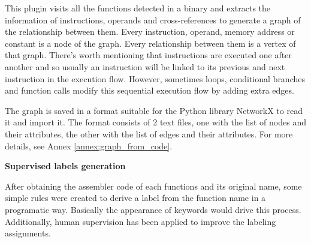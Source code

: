 This plugin visits all the functions detected in a binary and extracts the information of instructions, operands and cross-references to generate a graph of the relationship between them. Every instruction, operand, memory address or constant is a node of the graph. Every relationship between them is a vertex of that graph. There's worth mentioning that instructions are executed one after another and so usually an instruction will be linked to its previous and next instruction in the execution flow. However, sometimes loops, conditional branches and function calls modify this sequential execution flow by adding extra edges.

The graph is saved in a format suitable for the Python library NetworkX to read it and import it. The format consists of 2 text files, one with the list of nodes and their attributes, the other with the list of edges and their attributes. For more details, see Annex \ref{annex:graph_from_code}.




\textbf{Supervised labels generation}

After obtaining the assembler code of each functions and its original name, some simple rules were created to derive a label from the function name in a programatic way. Basically the appearance of keywords would drive this process. Additionally, human supervision has been applied to improve the labeling assignments. 

